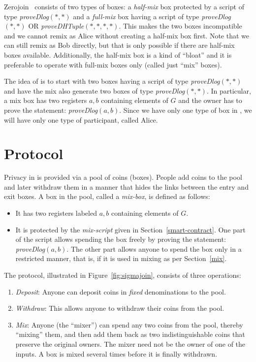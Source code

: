 \documentclass[runningheads]{llncs}
\newcommand{\zerojoin}{Zerojoin\xspace}
\begin{document}
\zerojoin~\cite{zerojoin} consists of two types of boxes: a {\em half-mix} box protected by a script of type {\em proveDlog$(*, *)$} and a {\em full-mix} box having a script of type {\em proveDlog$(*, *)$} \textsf{OR} {\em proveDHTuple$(*, *, *, *)$}. This makes the two boxes incompatible and we cannot remix as Alice without creating a half-mix box first. Note that we can still remix as Bob directly, but that is only possible if there are half-mix boxes available.
Additionally, the half-mix box is a kind of ``bloat'' and it is preferable to operate with full-mix boxes only (called just ``mix'' boxes).

The idea of \algname is to start with two boxes having a script of type {\em proveDlog$(*, *)$} and have the mix also generate two boxes of type {\em proveDlog$(*, *)$}. In particular, a mix box has two registers $a, b$ containing elements of $G$ and the owner has to prove the statement: {\em proveDlog$(a, b)$}.
Since we have only one type of box in \algname, we will have only one type of participant, called Alice.

\section{\algname Protocol}

Privacy in \algname is provided via a pool of coins (boxes). People add coins to the pool and later withdraw them in a manner that hides the links between the entry and exit boxes.
A box in the pool, called a {\em mix-box}, is defined as follows:
\begin{itemize}
    \item It has two registers labeled $a, b$ containing elements of $G$.
    \item It is protected by the {\em mix-script} given in Section~\ref{smart-contract}. One part of the script allows spending the box freely by proving the statement: {\em proveDlog$(a,b)$}. The other part allows anyone to spend the box only in a restricted manner, that is, if it is used in mixing as per Section~\ref{mix}.
\end{itemize}

The protocol, illustrated in Figure~\ref{fig:sigmajoin}, consists of three operations:

\begin{enumerate}
    \item {\em Deposit}: Anyone can deposit coins in {\em fixed} denominations to the pool.
    \item {\em Withdraw}: This allows anyone to withdraw their coins from the pool.
    \item {\em Mix}: Anyone (the ``mixer'') can spend any two coins from the pool, thereby ``mixing'' them, and then add them back as two indistinguishable coins that preserve the original owners. The mixer need not be the owner of one of the inputs.
    A box is mixed several times before it is finally withdrawn.
\end{enumerate}
\end{document}
